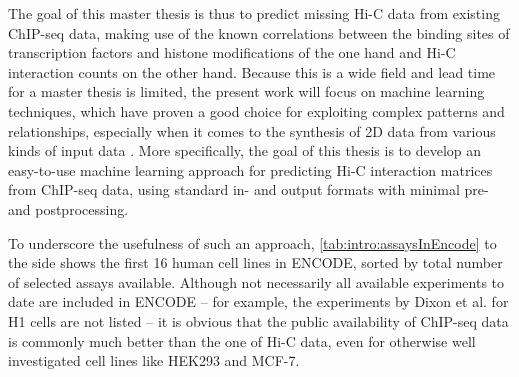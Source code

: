 The goal of this master thesis is thus to predict missing Hi-C data from existing ChIP-seq data,
making use of the known correlations between the binding sites of transcription factors and histone modifications of the one hand 
and Hi-C interaction counts on the other hand. 
Because this is a wide field and lead time for a master thesis is limited, 
the present work will focus on machine learning techniques,
which have proven a good choice for exploiting complex patterns
and relationships, especially when it comes to the synthesis of 
2D data from various kinds of input data \cite{Tsirikoglou2020}.
More specifically, the goal of this thesis is to develop an easy-to-use machine learning
approach for predicting Hi-C interaction matrices from ChIP-seq data, 
using standard in- and output formats with minimal pre- and postprocessing.

To underscore the usefulness of such an approach, \cref{tab:intro:assaysInEncode} to the side shows the first 16 human cell lines in ENCODE, 
sorted by total number of selected assays available.
Although not necessarily all available experiments to date are included in ENCODE -- for example, the experiments by Dixon et al. \cite{Dixon2015} for H1 cells are not listed -- 
it is obvious that the public availability of ChIP-seq data is commonly much better than the one of Hi-C data, even for otherwise well investigated cell lines like HEK293 and MCF-7.


